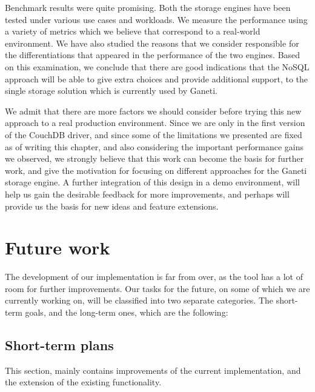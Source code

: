 Benchmark results were quite promising. Both the storage engines have been
tested under various use cases and workloads. We measure the performance using
a variety of metrics which we believe that correspond to a real-world
environment. We have also studied the reasons that we consider responsible for
the differentiations that appeared in the performance of the two engines. Based
on this examination, we conclude that there are good indications that the NoSQL
approach will be able to give extra choices and provide additional support, to
the single storage solution which is currently used by Ganeti.

We admit that there are more factors we should consider before trying this new
approach to a real production environment. Since we are only in the first
version of the CouchDB driver, and since some of the limitations we presented
are fixed as of writing this chapter, and also considering the important
performance gains we observed, we strongly believe that this work can become the
basis for further work, and give the motivation for focusing on different
approaches for the Ganeti storage engine. A further integration of this design
in a demo environment, will help us gain the desirable feedback for more
improvements, and perhaps will provide us the basis for new ideas and feature
extensions.

\section{Future work}\label{sec:future}

The development of our implementation is far from over, as the tool has a lot of
room for further improvements. Our tasks for the future, on some of which we are
currently working on, will be classified into two separate categories. The
short-term goals, and the long-term ones, which are the following:

\subsection{Short-term plans}

This section, mainly contains improvements of the current implementation, and
the extension of the existing functionality.

